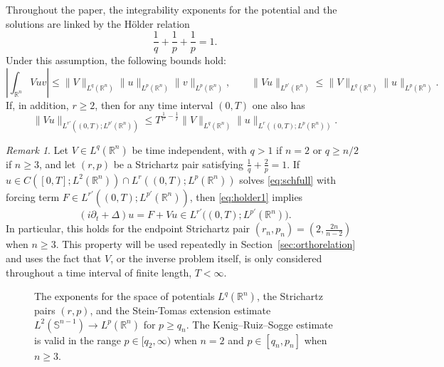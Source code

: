 \documentclass[11pt,a4paper]{amsart}
\theoremstyle{remark}
\newtheorem{remark}[proposition]{Remark}
\theoremstyle{definition}
\newcommand{\R}{\mathbb{R}}
\begin{document}
Throughout the paper, the integrability exponents for the potential and the solutions are linked by the H\"older relation
\[
\frac{1}{q}+\frac{1}{p}+\frac{1}{p}=1.
\]
Under this assumption, the following bounds hold:
\begin{equation}\label{eq:holder}
\left|\int_{\R^n} V u v\right| \leq \|V\|_{L^q(\R^n)} \|u\|_{L^p(\R^n)}\|v\|_{L^p(\R^n)},\qquad \|Vu\|_{L^{p'}(\R^n)}\leq \|V\|_{L^q(\R^n)}\|u\|_{L^p(\R^n)}.
\end{equation}
If, in addition, $r\geq 2$, then for any time interval $(0,T)$ one also has
\begin{equation}\label{eq:holder1}
\|Vu\|_{L^{r'} \left((0,T);L^{p'}(\R^n)\right)} \leq T^{\frac{1}{r'}-\frac{1}{r}} \|V\|_{L^q(\R^n)} \|u\|_{L^r \left((0,T);L^p(\R^n)\right)}.
\end{equation}

\begin{remark}\label{rmrk:VuinLp'} Let $V\in L^q(\R^n)$ be time independent, with $q>1$ if $n=2$ or $q\geq n/2$ if $n\geq3$, and let $(r,p)$ be a Strichartz pair satisfying $\frac1q+\frac2p=1$. If $u\in C([0,T];L^2(\R^n))\cap L^r((0,T);L^p(\R^n))$ solves \eqref{eq:schfull} with forcing term $F\in L^{r'}((0,T);L^{p'}(\R^n))$, then \eqref{eq:holder1} implies
\[
(i\partial_t+\Delta)u = F+Vu \in L^{r'}\big((0,T);L^{p'}(\R^n)\big).
\]
In particular, this holds for the endpoint Strichartz pair $(r_n,p_n)=(2,\frac{2n}{n-2})$ when $n\ge3$. This property will be used repeatedly in Section~\ref{sec:orthorelation} and uses the fact that $V$, or the inverse problem itself, is only considered throughout a time interval of finite length, $T<\infty$.
\end{remark}


\begin{figure}[htb]
\centering
\def\svgwidth{300pt}

\vspace{-5em}
\caption[Strichartz line]{\small The exponents for the space of potentials $L^q(\R^n)$, the Strichartz pairs $(r,p)$, and the Stein-Tomas extension estimate $L^2(\mathbb S^{n-1})\to L^{p}(\R^n)$ for $p\geq q_n$. The Kenig--Ruiz--Sogge estimate is valid in the range $p\in [q_2,\infty)$ when $n=2$ and $p\in[q_n,p_n]$ when $n\geq 3$.} \label{fig:str}
\end{figure}
\end{document}
